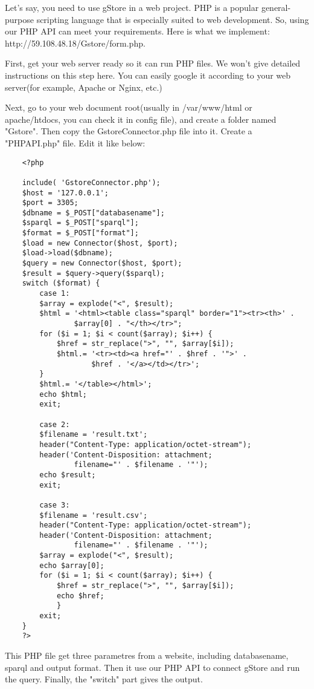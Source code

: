 \documentclass[titlepage, a4paper, 12pt]{article}
\begin{document}
	Let's say, you need to use gStore in a web project. PHP is a popular general-purpose scripting language that is especially suited to web development. So, using our PHP API can meet your requirements. Here is what we implement: http://59.108.48.18/Gstore/form.php.

	First, get your web server ready so it can run PHP files. We won't give detailed instructions on this step here. You can easily google it according to your web server(for example, Apache or Nginx, etc.) 
	
	Next, go to your web document root(usually in /var/www/html or apache/htdocs, you can check it in config file), and create a folder named "Gstore". Then copy the GstoreConnector.php file into it. Create a "PHPAPI.php" file. Edit it like below:

	\begin{verbatim}
	<?php

	include( 'GstoreConnector.php');
	$host = '127.0.0.1';
	$port = 3305;
	$dbname = $_POST["databasename"];
	$sparql = $_POST["sparql"];
	$format = $_POST["format"];
	$load = new Connector($host, $port);
	$load->load($dbname);
	$query = new Connector($host, $port);
	$result = $query->query($sparql);
	switch ($format) {
    	case 1:
        $array = explode("<", $result);
        $html = '<html><table class="sparql" border="1"><tr><th>' . 
                $array[0] . "</th></tr>";
        for ($i = 1; $i < count($array); $i++) {
            $href = str_replace(">", "", $array[$i]);
            $html.= '<tr><td><a href="' . $href . '">' . 
                    $href . '</a></td></tr>';
        }
        $html.= '</table></html>';
        echo $html;
        exit;

    	case 2:
        $filename = 'result.txt';
        header("Content-Type: application/octet-stream");
        header('Content-Disposition: attachment; 
                filename="' . $filename . '"');
        echo $result;
        exit;

    	case 3:
        $filename = 'result.csv';
        header("Content-Type: application/octet-stream");
        header('Content-Disposition: attachment; 
                filename="' . $filename . '"');
        $array = explode("<", $result);
        echo $array[0];
        for ($i = 1; $i < count($array); $i++) {
            $href = str_replace(">", "", $array[$i]);
            echo $href;
        	}
        exit;
	}
	?>
	\end{verbatim}

	This PHP file get three parametres from a website, including databasename, sparql and output format. Then it use our PHP API to connect gStore and run the query. Finally, the "switch" part gives the output. 
\end{document}
